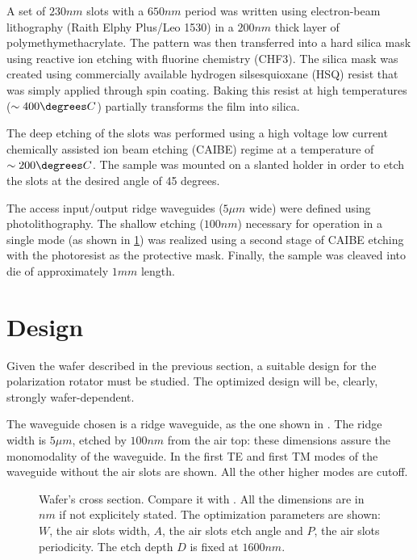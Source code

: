 A set of $230 nm$ slots with a $650 nm$ period was written using
electron-beam lithography (Raith Elphy Plus/Leo 1530) in a $200 nm$
thick layer of polymethymethacrylate. The pattern was then transferred
into a hard silica mask using reactive ion etching with fluorine
chemistry (CHF3). The silica mask was created using commercially
available hydrogen silsesquioxane (HSQ) resist that was simply applied
through spin coating. Baking this resist at high temperatures ($\sim
400\degrees C$) partially transforms the film into silica.

The deep etching of the slots was performed using a high voltage low
current chemically assisted ion beam etching (CAIBE) regime at a
temperature of $\sim 200\degrees C$. The sample was mounted on a slanted
holder in order to etch the slots at the desired angle of 45
degrees.

The access input/output ridge waveguides ($5 \mu m$ wide) were defined
using photolithography. The shallow etching ($100 nm$) necessary for
operation in a single mode (as shown in \ref{sec:polrot_design}) was
realized using a second stage of CAIBE etching with the photoresist as
the protective mask. Finally, the sample was cleaved into die of
approximately $1mm$ length.

\section{Design} \label{sec:polrot_design}

Given the wafer described in the previous section, a suitable design
for the polarization rotator must be studied. The optimized design
will be, clearly, strongly wafer-dependent.

The waveguide chosen is a ridge waveguide, as the one shown in
. The ridge width is $5 \mu m$, etched by $100
nm$ from the air top: these dimensions assure the monomodality of the
waveguide. In  the first TE and
first TM modes of the waveguide without the air slots are
shown. All the other higher modes are cutoff.

\begin{figure}[htbp]
  \begin{center}
    \resizebox{!}{5cm}{}
    \resizebox{!}{5cm}{}
  \end{center}
  \caption{Wafer's cross section. Compare it with
  . All the dimensions are in
  $nm$ if not explicitely stated. The optimization parameters are
  shown: $W$, the air slots width, $A$, the air slots etch angle and
  $P$, the air slots periodicity. The etch depth $D$ is fixed at $1600
  nm$.}
  \label{fig:polrot_wafer}
\end{figure}

